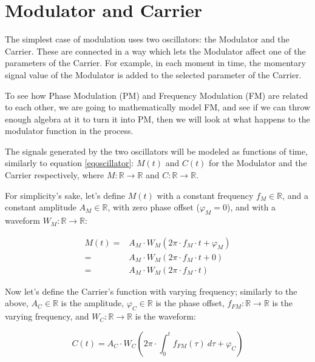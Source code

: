 \documentclass{article}
\begin{document}
  \section{Modulator and Carrier}

    The simplest case of modulation uses two oscillators: the Modulator and the
    Carrier. These are connected in a way which lets the Modulator affect one
    of the parameters of the Carrier. For example, in each moment in time, the
    momentary signal value of the Modulator is added to the selected parameter
    of the Carrier.

    To see how Phase Modulation (PM) and Frequency Modulation (FM) are related
    to each other, we are going to mathematically model FM, and see if we can
    throw enough algebra at it to turn it into PM, then we will look at what
    happens to the modulator function in the process.

    The signals generated by the two oscillators will be modeled as functions
    of time, similarly to equation \ref{eqoscillator}: $M(t)$ and $C(t)$ for
    the Modulator and the Carrier respectively, where
    $M \colon \mathbb{R} \to \mathbb{R}$ and
    $C \colon \mathbb{R} \to \mathbb{R}$.

    For simplicity's sake, let's define $M(t)$ with a constant frequency
    $f_M \in \mathbb{R}$, and a constant amplitude $A_M \in \mathbb{R}$, with
    zero phase offset ($\varphi_M = 0$), and with a waveform
    $W_M \colon \mathbb{R} \to \mathbb{R}$:

    \begin{equation}\label{eqmodulator}
      \begin{split}
        M(t) = & A_M \cdot W_M(2\pi \cdot f_M \cdot t + \varphi_M) \\
             = & A_M \cdot W_M(2\pi \cdot f_M \cdot t + 0) \\
             = & A_M \cdot W_M(2\pi \cdot f_M \cdot t)
      \end{split}
    \end{equation}

    Now let's define the Carrier's function with varying frequency; similarly
    to the above, $A_C \in \mathbb{R}$ is the amplitude,
    $\varphi_C \in \mathbb{R}$ is the phase offset,
    $f_{FM} \colon \mathbb{R} \to \mathbb{R}$ is the varying frequency, and
    $W_C \colon \mathbb{R} \to \mathbb{R}$ is the waveform:

    \begin{equation}\label{eqcarrier}
      C(t) =
        A_C \cdot W_C \left(
          2\pi \cdot \int_{0}^{t} f_{FM}(\tau) \  d\tau + \varphi_C
        \right)
    \end{equation}
\end{document}
